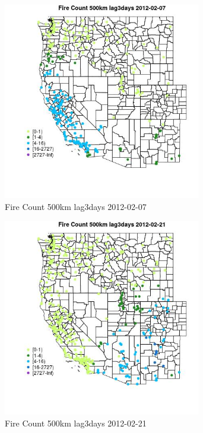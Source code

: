 \begin{figure} 
\centering  
\includegraphics[width=0.77\textwidth]{Code_Outputs/Report_ML_input_PM25_Step4_part_f_de_duplicated_aves_prioritize_24hr_obswNAs_MapObsFire_Count_500km_lag3days2012-02-07.jpg} 
\caption{\label{fig:Report_ML_input_PM25_Step4_part_f_de_duplicated_aves_prioritize_24hr_obswNAsMapObsFire_Count_500km_lag3days2012-02-07}Fire Count 500km lag3days 2012-02-07} 
\end{figure} 
 

\begin{figure} 
\centering  
\includegraphics[width=0.77\textwidth]{Code_Outputs/Report_ML_input_PM25_Step4_part_f_de_duplicated_aves_prioritize_24hr_obswNAs_MapObsFire_Count_500km_lag3days2012-02-21.jpg} 
\caption{\label{fig:Report_ML_input_PM25_Step4_part_f_de_duplicated_aves_prioritize_24hr_obswNAsMapObsFire_Count_500km_lag3days2012-02-21}Fire Count 500km lag3days 2012-02-21} 
\end{figure} 
 

